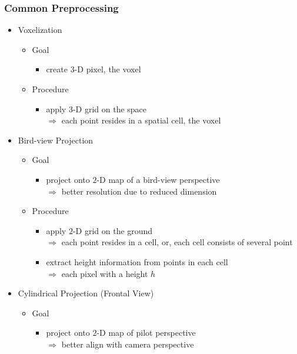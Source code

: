 \subsubsection{Common Preprocessing}
\begin{itemize}
\item Voxelization
	\begin{itemize}
	\item Goal
		\begin{itemize}
		\item create $3$-D pixel, the voxel
		\end{itemize}
	\item Procedure
		\begin{itemize}
		\item apply $3$-D grid on the space \\ 
		$\Rightarrow$ each point resides in a spatial cell, the voxel
		\end{itemize}
	\end{itemize}
\item Bird-view Projection
	\begin{itemize}
	\item Goal
		\begin{itemize}
		\item project onto $2$-D map of a bird-view perspective \\
		$\Rightarrow$ better resolution due to reduced dimension
		\end{itemize}
	\item Procedure
		\begin{itemize}
		\item apply $2$-D grid on the ground \\
		$\Rightarrow$ each point resides in a cell, or, each cell consists of several point
		\item extract height information from points in each cell \\
		$\Rightarrow$ each pixel with a height $h$
		\end{itemize}
	\end{itemize}
\item Cylindrical Projection (Frontal View)
	\begin{itemize}
	\item Goal
		\begin{itemize}
		\item project onto $2$-D map of pilot perspective \\
		$\Rightarrow$ better align with camera perspective
		\end{itemize}

\end{itemize}
\end{itemize}
